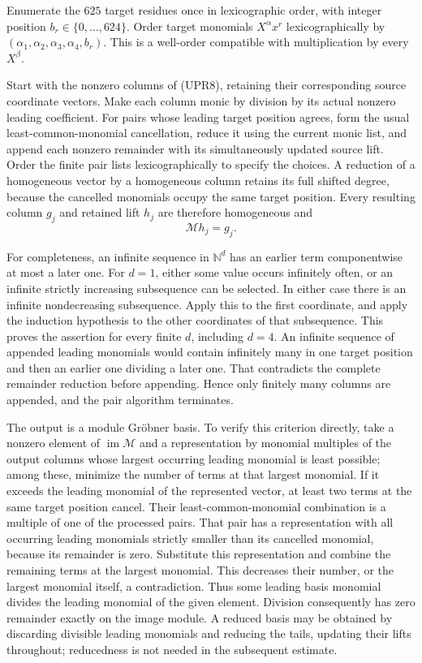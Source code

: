 Enumerate the \(625\) target residues once in lexicographic order,
with integer position \(b_r\in\{0,\ldots,624\}\).  Order target
monomials \(X^\alpha x^r\) lexicographically by
\((\alpha_1,\alpha_2,\alpha_3,\alpha_4,b_r)\).
This is a well-order compatible with multiplication by every
\(X^\beta\).

Start with the nonzero columns of (UPR8), retaining their corresponding
source coordinate vectors.  Make each column monic by division by
its actual nonzero leading coefficient.  For pairs whose leading
target position agrees, form the usual least-common-monomial
cancellation, reduce it using the current monic list, and append
each nonzero remainder with its simultaneously updated source
lift.  Order the finite pair lists lexicographically to specify
the choices.  A reduction of a homogeneous vector by a homogeneous
column retains its full shifted degree, because the cancelled
monomials occupy the same target position.  Every resulting column
\(g_j\) and retained lift \(h_j\) are therefore homogeneous and
\[
\mathcal M h_j=g_j.
\tag{UPR10}
\]

For completeness, an infinite sequence in \(\mathbb N^d\) has an
earlier term componentwise at most a later one.  For \(d=1\), either
some value occurs infinitely often, or an infinite strictly
increasing subsequence can be selected.  In either case there is
an infinite nondecreasing subsequence.  Apply this to the first
coordinate, and apply the induction hypothesis to the other
coordinates of that subsequence.  This proves the assertion for
every finite \(d\), including \(d=4\).
An infinite sequence of appended leading monomials would contain
infinitely many in one target position and then an earlier one
dividing a later one.  That contradicts the complete remainder
reduction before appending.  Hence only finitely many columns are
appended, and the pair algorithm terminates.

The output is a module Gr\"obner basis.  To verify this criterion
directly, take a nonzero element of \(\operatorname{im}\mathcal M\)
and a representation by monomial multiples of the output columns
whose largest occurring leading monomial is least possible; among
these, minimize the number of terms at that largest monomial.
If it exceeds the leading monomial of the represented vector,
at least two terms at the same target position cancel.
Their least-common-monomial combination is a multiple of one of
the processed pairs.  That pair has a representation with all
occurring leading monomials strictly smaller than its cancelled
monomial, because its remainder is zero.  Substitute this
representation and combine the remaining terms at the largest
monomial.  This decreases their number, or the largest monomial
itself, a contradiction.  Thus some leading basis monomial divides
the leading monomial of the given element.  Division consequently
has zero remainder exactly on the image module.
A reduced basis may be obtained by discarding divisible leading
monomials and reducing the tails, updating their lifts throughout;
reducedness is not needed in the subsequent estimate.

